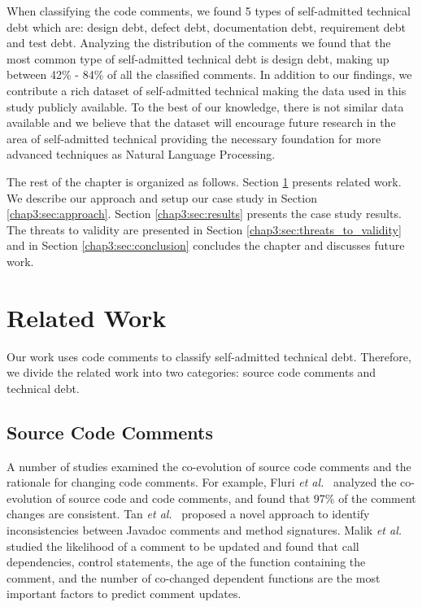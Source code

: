 When classifying the code comments, we found 5 types of self-admitted technical debt which are: design debt, defect debt, documentation debt, requirement debt and test debt. Analyzing the distribution of the comments we found that the most common type of self-admitted technical debt is design debt, making up between 42\% - 84\% of all the classified comments. In addition to our findings, we contribute a rich dataset of self-admitted technical making the data used in this study publicly available. To the best of our knowledge, there is not similar data available and we believe that the dataset will encourage future research in the area of self-admitted technical providing the necessary foundation for more advanced techniques as Natural Language Processing.  

The rest of the chapter is organized as follows. Section \ref{chap3:sec:related_work} presents related work. We describe our approach and setup our case study in Section \ref{chap3:sec:approach}. Section \ref{chap3:sec:results} presents the case study results. The threats to validity are presented in Section \ref{chap3:sec:threats_to_validity} and in Section \ref{chap3:sec:conclusion} concludes the chapter and discusses future work. 

\section{Related Work}
\label{chap3:sec:related_work}
Our work uses code comments to classify self-admitted technical debt. Therefore, we divide the related work into two categories: source code comments and technical debt.

\subsection{Source Code Comments}

A number of studies examined the co-evolution of source code comments and the rationale for changing code comments. For example, Fluri \textit{et al.}~\cite{Fluri2007WCRE} analyzed the co-evolution of source code and code comments, and found that 97\% of the comment changes are consistent. Tan \textit{et al.}~\cite{Tan2012ICST} proposed a novel approach to identify inconsistencies between Javadoc comments and method signatures. Malik \textit{et al.}~\cite{Malik2008ICSM} studied the likelihood of a comment to be updated and found that call dependencies, control statements, the age of the function containing the comment, and the number of co-changed dependent functions are the most important factors to predict comment updates.

